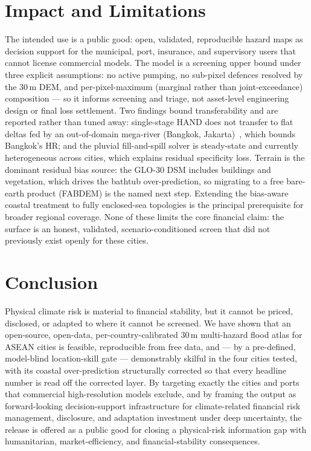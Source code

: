 \documentclass[11pt,a4paper]{article}
\begin{document}
\section{Impact and Limitations}
The intended use is a public good: open, validated, reproducible hazard maps as decision support for the municipal, port, insurance, and supervisory users that cannot license commercial models. The model is a screening upper bound under three explicit assumptions: no active pumping, no sub-pixel defences resolved by the 30\,m DEM, and per-pixel-maximum (marginal rather than joint-exceedance) composition --- so it informs screening and triage, not asset-level engineering design or final loss settlement. Two findings bound transferability and are reported rather than tuned away: single-stage HAND does not transfer to flat deltas fed by an out-of-domain mega-river (Bangkok, Jakarta)~\cite{komori2012}, which bounds Bangkok's HR; and the pluvial fill-and-spill solver is steady-state and currently heterogeneous across cities, which explains residual specificity loss. Terrain is the dominant residual bias source: the GLO-30 DSM includes buildings and vegetation, which drives the bathtub over-prediction, so migrating to a free bare-earth product (FABDEM) is the named next step. Extending the bias-aware coastal treatment to fully enclosed-sea topologies is the principal prerequisite for broader regional coverage. None of these limits the core financial claim: the surface is an honest, validated, scenario-conditioned screen that did not previously exist openly for these cities.

\section{Conclusion}
Physical climate risk is material to financial stability, but it cannot be priced, disclosed, or adapted to where it cannot be screened. We have shown that an open-source, open-data, per-country-calibrated 30\,m multi-hazard flood atlas for ASEAN cities is feasible, reproducible from free data, and --- by a pre-defined, model-blind location-skill gate --- demonstrably skilful in the four cities tested, with its coastal over-prediction structurally corrected so that every headline number is read off the corrected layer. By targeting exactly the cities and ports that commercial high-resolution models exclude, and by framing the output as forward-looking decision-support infrastructure for climate-related financial risk management, disclosure, and adaptation investment under deep uncertainty, the release is offered as a public good for closing a physical-risk information gap with humanitarian, market-efficiency, and financial-stability consequences.
\end{document}
